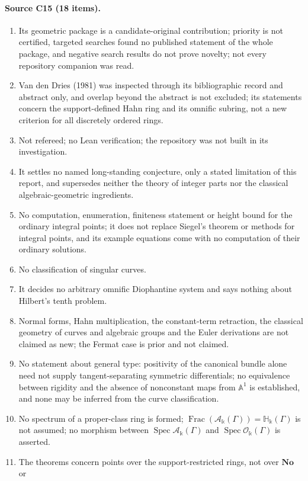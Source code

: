 \documentclass[11pt,oneside]{article}
\numberwithin{equation}{section}
\theoremstyle{definition}
\theoremstyle{remark}
\newcommand{\No}{\mathbf{No}}
\newcommand{\Frac}{\operatorname{Frac}}
\newcommand{\crH}{\mathbb H_\Bbbk(\Gamma)}
\newcommand{\crA}{\mathcal A_\Bbbk(\Gamma)}
\newcommand{\crO}{\mathcal O_\Bbbk(\Gamma)}
\newcommand{\Aff}{\mathbb A}
\newcommand{\Spec}{\operatorname{Spec}}
\begin{document}
\paragraph{Source C15 (18 items).}
\begin{enumerate}[leftmargin=*,itemsep=1pt]
\item Its geometric package is a candidate-original contribution; priority is not
certified, targeted searches found no published statement of the whole package, and
negative search results do not prove novelty; not every repository companion was read.
\item Van den Dries (1981) was inspected through its bibliographic record and abstract
only, and overlap beyond the abstract is not excluded; its statements concern the
support-defined Hahn ring and its omnific subring, not a new criterion for all discretely
ordered rings.
\item Not refereed; no Lean verification; the repository was not built in its
investigation.
\item It settles no named long-standing conjecture, only a stated limitation of this
report, and supersedes neither the theory of integer parts nor the classical
algebraic-geometric ingredients.
\item No computation, enumeration, finiteness statement or height bound for the ordinary
integral points; it does not replace Siegel's theorem or methods for integral points,
and its example equations come with no computation of their ordinary solutions.
\item No classification of singular curves.
\item It decides no arbitrary omnific Diophantine system and says nothing about
Hilbert's tenth problem.
\item Normal forms, Hahn multiplication, the constant-term retraction, the classical
geometry of curves and algebraic groups and the Euler derivations are not claimed as
new; the Fermat case is prior and not claimed.
\item No statement about general type: positivity of the canonical bundle alone need not
supply tangent-separating symmetric differentials; no equivalence between rigidity and
the absence of nonconstant maps from $\Aff^1$ is established, and none may be inferred
from the curve classification.
\item No spectrum of a proper-class ring is formed; $\Frac(\crA)=\crH$ is not assumed; no
morphism between $\Spec\crA$ and $\Spec\crO$ is asserted.
\item The theorems concern points over the support-restricted rings, not over $\No$ or

\end{enumerate}
\end{document}
